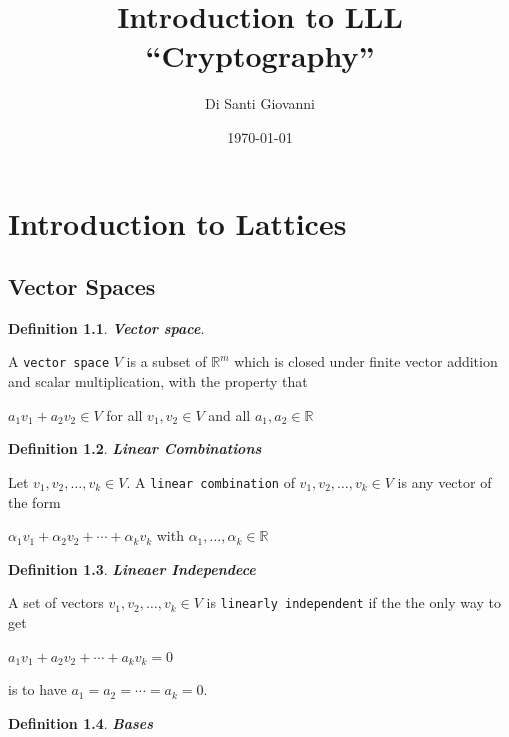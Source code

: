 \documentclass[a4paper,12pt]{report}
\title{Introduction to LLL\\``Cryptography''}
\author{Di Santi Giovanni}
\date{\today}
\newtheorem{definition}{Definition}[section]
\newcommand{\R}{\mathbb{R}}
\begin{document}
 
\maketitle

\tableofcontents

\chapter{Introduction to Lattices}

\section{Vector Spaces}

\begin{definition}
    \textbf{Vector space}.
\end{definition}
A \texttt{vector space} $V$ is a subset of $\R^{m}$ which is closed under finite vector addition and scalar multiplication, with the property that

\begin{center}
   $a_1v_1 + a_2v_2 \in V$ for all $v_1,v_2 \in V$ and all $a_1,a_2 \in \R$
\end{center}

\begin{definition}
    \textbf{Linear Combinations}
\end{definition}

Let $v_1,v_2,\ldots,v_k \in V$. A \texttt{linear combination} of $v_1,v_2,\ldots,v_k \in V$ is any vector of the form

\begin{center}
    $\alpha_1v_1 + \alpha_2v_2 + \cdots + \alpha_kv_k$ with $\alpha_1, \ldots, \alpha_k \in \R$
\end{center}

\begin{definition}
    \textbf{Lineaer Independece}
\end{definition}

A set of vectors $v_1,v_2,\ldots,v_k \in V$ is \texttt{linearly independent} if the the only way to get

\begin{center}
    $a_1v_1 + a_2v_2 + \cdots + a_kv_k = 0$
\end{center}

is to have $a_1 = a_2 = \cdots = a_k = 0$.

\begin{definition}
    \textbf{Bases}
\end{definition}
\end{document}

